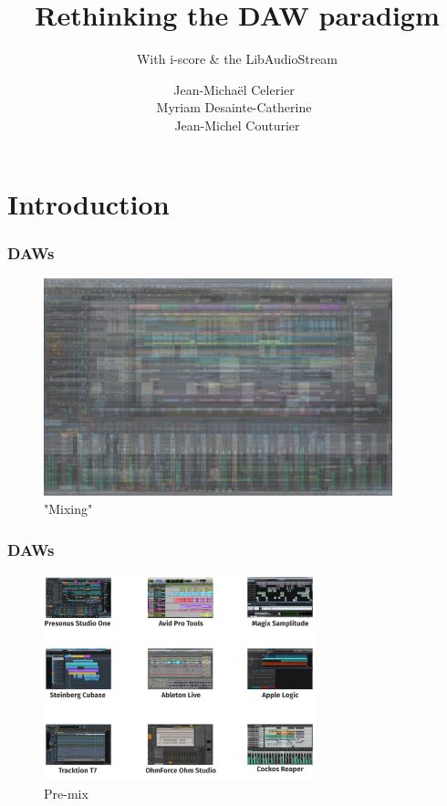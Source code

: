 \documentclass[draft]{beamer}
\title{Rethinking the DAW paradigm}
\subtitle{With i-score \& the LibAudioStream}
\date{}
\author{Jean-Michaël Celerier~\\ Myriam Desainte-Catherine~\\ Jean-Michel Couturier}
\institute{LaBRI, Blue Yeti}
\begin{document}
    
\maketitle
\begin{frame}
	\tableofcontents
\end{frame}
\section{Introduction}

\begin{frame}
    \frametitle{DAWs}    
    \Large
    \begin{figure}
        \centering
        \includegraphics[width=0.9\textwidth]{images/daws/together-flattened.png}
        \caption{"Mixing"}
    \end{figure}
\end{frame}

\begin{frame}
    \frametitle{DAWs}    
    \Large
    \begin{figure}
        \centering
        \includegraphics[width=0.7\textwidth]{images/daws/together-text.png}
        \caption{Pre-mix}
    \end{figure}
\end{frame}
\end{document}
